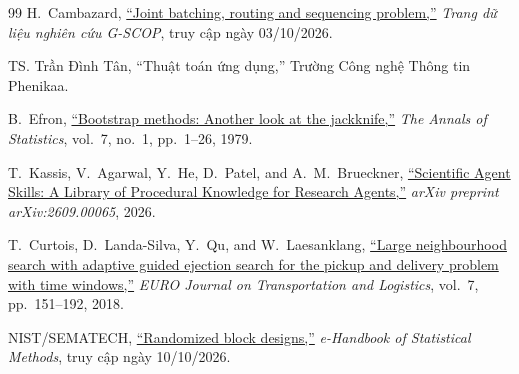 \begin{thebibliography}{99}
H.~Cambazard,
\href{https://pagesperso.g-scop.grenoble-inp.fr/~cambazah/sequencing/index.html}{``Joint batching, routing and sequencing problem,''}
\emph{Trang dữ liệu nghiên cứu G-SCOP}, truy cập ngày 03/10/2026.

TS. Trần Đình Tân, ``Thuật toán ứng dụng,'' Trường Công nghệ Thông tin Phenikaa.

B.~Efron,
\href{https://doi.org/10.1214/aos/1176344552}{``Bootstrap methods: Another look at the jackknife,''}
\emph{The Annals of Statistics}, vol.~7, no.~1, pp.~1--26, 1979.

T.~Kassis, V.~Agarwal, Y.~He, D.~Patel, and A.~M.~Brueckner,
\href{https://doi.org/10.48550/arXiv.2609.00065}{``Scientific Agent Skills: A Library of Procedural Knowledge for Research Agents,''}
\emph{arXiv preprint arXiv:2609.00065}, 2026.

T.~Curtois, D.~Landa-Silva, Y.~Qu, and W.~Laesanklang,
\href{https://doi.org/10.1007/s13676-017-0115-6}{``Large neighbourhood search with adaptive guided ejection search for the pickup and delivery problem with time windows,''}
\emph{EURO Journal on Transportation and Logistics}, vol.~7, pp.~151--192, 2018.

NIST/SEMATECH,
\href{https://www.itl.nist.gov/div898/handbook/pri/section3/pri332.htm}{``Randomized block designs,''}
\emph{e-Handbook of Statistical Methods}, truy cập ngày 10/10/2026.

\end{thebibliography}
\endgroup
